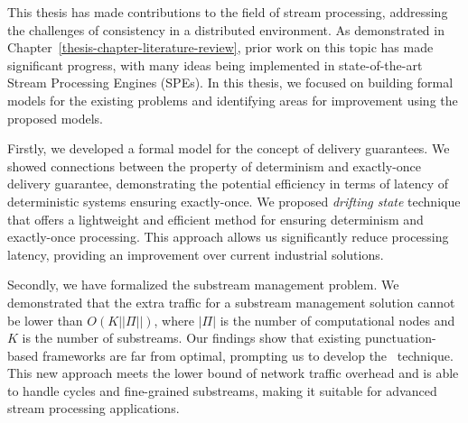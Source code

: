 This thesis has made contributions to the field of stream processing, addressing the challenges of consistency in a distributed environment. As demonstrated in Chapter~\ref{thesis-chapter-literature-review}, prior work on this topic has made significant progress, with many ideas being implemented in state-of-the-art Stream Processing Engines (SPEs). In this thesis, we focused on building formal models for the existing problems and identifying areas for improvement using the proposed models.

Firstly, we developed a formal model for the concept of delivery guarantees. We showed connections between the property of determinism and exactly-once delivery guarantee, demonstrating the potential efficiency in terms of latency of deterministic systems ensuring exactly-once. We proposed {\em drifting state} technique that offers a lightweight and efficient method for ensuring determinism and exactly-once processing. This approach allows us significantly reduce processing latency, providing an improvement over current industrial solutions.

Secondly, we have formalized the substream management problem. We demonstrated that the extra traffic for a substream management solution cannot be lower than $O(K||\Pi||)$, where $|\Pi|$ is the number of computational nodes and $K$ is the number of substreams. Our findings show that existing punctuation-based frameworks are far from optimal, prompting us to develop the \tracker\ technique. This new approach meets the lower bound of network traffic overhead and is able to handle cycles and fine-grained substreams, making it suitable for advanced stream processing applications.


